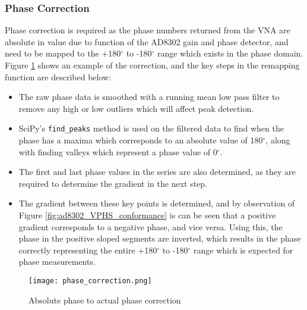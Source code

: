 \subsubsection{Phase Correction}
Phase correction is required as the phase numbers returned from the VNA are absolute in value due to function of the AD8302 gain and phase detector, and need to be mapped to the +180$^\circ$ to -180$^\circ$ range which exists in the phase domain. Figure \ref{fig:phase_correction} shows an example of the correction, and the key steps in the remapping function are described below:
\begin{itemize}
	\item The raw phase data is smoothed with a running mean low pass filter to remove any high or low outliers which will affect peak detection.
	\item SciPy's \texttt{find\_peaks} method is used on the filtered data to find when the phase has a maxima which corresponds to an absolute value of 180$^\circ$, along with finding valleys which represent a phase value of 0$^\circ$.
	\item The first and last phase values in the series are also determined, as they are required to determine the gradient in the next step. 
	\item The gradient between these key points is determined, and by observation of Figure \ref{fig:ad8302_VPHS_conformance} is can be seen that a positive gradient corresponds to a negative phase, and vice versa. Using this, the phase in the positive sloped segments are inverted, which results in the phase correctly representing the entire +180$^\circ$ to -180$^\circ$ range which is expected for phase measurements. 
\end{itemize} 

\begin{figure}[H]
	\centering
	\texttt{[image: phase\_correction.png]}
	\caption{Absolute phase to actual phase correction}
	\label{fig:phase_correction}
\end{figure}


